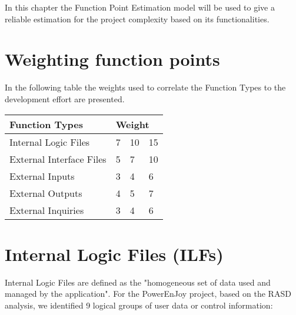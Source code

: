 In this chapter the Function Point Estimation model will be used to give a reliable estimation for the project complexity based
on its functionalities.


\section{Weighting function points} \label{sec:weights}
In the following table the weights used to correlate the Function Types to the development effort are presented.

\begin{center}
  \begin{tabular}{ |l|l|l|l| }
    \hline
    Function Types & \multicolumn{3}{l|}{Weight} \\ \hline
    Internal Logic Files & 7 & 10 & 15 \\ \hline
    External Interface Files & 5 & 7 & 10 \\ \hline
    External Inputs & 3 & 4 & 6 \\ \hline
    External Outputs & 4 & 5 & 7 \\ \hline
    External Inquiries & 3 & 4 & 6 \\ \hline
  \end{tabular}
\end{center}


\section{Internal Logic Files (ILFs)}
Internal Logic Files are defined as the "homogeneous set of data used and managed by the application". For the PowerEnJoy project, based on the RASD analysis, we identified 9 logical groups of user data or control information: \\

